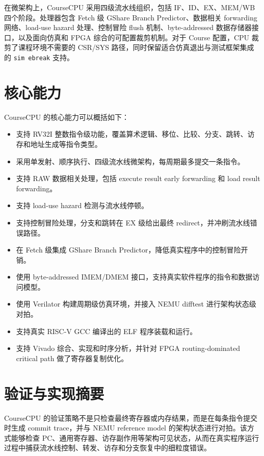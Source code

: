\documentclass[UTF8,a4paper,12pt]{ctexrep}
\begin{document}
在微架构上，CourseCPU 采用四级流水线组织，包括 IF、ID、EX、MEM/WB 四个阶段。处理器包含 Fetch 级 GShare Branch Predictor、数据相关 forwarding 网络、load-use hazard 处理、控制冒险 flush 机制、byte-addressed 数据存储器接口，以及面向仿真和 FPGA 综合的可配置裁剪机制。对于 Course 配置，CPU 裁剪了课程环境不需要的 CSR/SYS 路径，同时保留适合仿真退出与测试框架集成的 \texttt{sim ebreak} 支持。

\section{核心能力}

CourseCPU 的核心能力可以概括如下：

\begin{itemize}
  \item 支持 RV32I 整数指令级功能，覆盖算术逻辑、移位、比较、分支、跳转、访存和地址生成等指令类型。
  \item 采用单发射、顺序执行、四级流水线微架构，每周期最多提交一条指令。
  \item 支持 RAW 数据相关处理，包括 execute result early forwarding 和 load result forwarding。
  \item 支持 load-use hazard 检测与流水线停顿。
  \item 支持控制冒险处理，分支和跳转在 EX 级给出最终 redirect，并冲刷流水线错误路径。
  \item 在 Fetch 级集成 GShare Branch Predictor，降低真实程序中的控制冒险开销。
  \item 使用 byte-addressed IMEM/DMEM 接口，支持真实软件程序的指令和数据访问模型。
  \item 使用 Verilator 构建周期级仿真环境，并接入 NEMU difftest 进行架构状态级对拍。
  \item 支持真实 RISC-V GCC 编译出的 ELF 程序装载和运行。
  \item 支持 Vivado 综合、实现和时序分析，并针对 FPGA routing-dominated critical path 做了寄存器复制优化。
\end{itemize}

\section{验证与实现摘要}

CourseCPU 的验证策略不是只检查最终寄存器或内存结果，而是在每条指令提交时生成 commit trace，并与 NEMU reference model 的架构状态进行对拍。该方式能够检查 PC、通用寄存器、访存副作用等架构可见状态，从而在真实程序运行过程中捕获流水线控制、转发、访存和分支恢复中的细粒度错误。
\end{document}
